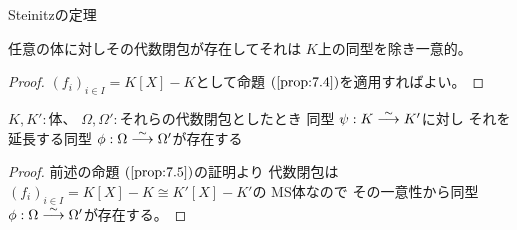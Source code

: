 \documentclass[../master_galois_theory]{subfiles}
\begin{document}
\begin{prop} \label{prop:7.5}
  \rm{Steinitz}の定理

  任意の体に対しその代数閉包が存在してそれは $K$上の同型を除き一意的。
\end{prop}

\begin{proof}
  $(f_i)_{i \in I} = K[X] - K$として命題 $(\mathrm{\ref{prop:7.4}})$を適用すればよい。
\end{proof}

\begin{corl}
  $K , K' :$体、 $\Omega , \Omega' :$それらの代数閉包としたとき
  同型 $\psi : K \overset{\sim}{\longrightarrow} K'$に対し
  それを延長する同型 $\phi : \Omega \overset{\sim}{\longrightarrow} \Omega'$が存在する
\end{corl}

\begin{proof}
  前述の命題 $(\mathrm{\ref{prop:7.5}})$の証明より
  代数閉包は $(f_i)_{i \in I} = K[X] - K \cong K'[X] - K'$の \rm{MS}体なので
  その一意性から同型 $\phi : \Omega \overset{\sim}{\longrightarrow} \Omega'$が存在する。
\end{proof}

\clearpage
\end{document}

